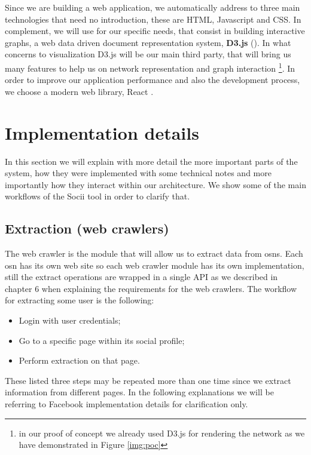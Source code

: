 Since we are building a web application, we automatically address to three main technologies that need no introduction, these are HTML, Javascript and CSS. In complement, we will use for our specific needs, that consist in building interactive graphs, a web data driven document representation system, \textbf{D3.js} (\cite{bostock2012d3}). In what concerns to visualization D3.js will be our main third party, that will bring us many features to help us on network representation and graph interaction \footnote{in our proof of concept we already used D3.js for rendering the network as we have demonstrated in Figure \ref{img:poc}}.
In order to improve our application performance and also the development process, we choose a modern web library, React \cite{react}.

\section{Implementation details}

In this section we will explain with more detail the more important parts of the system, how they were implemented with some technical notes and more importantly how they interact within our architecture. We show some of the main workflows of the Socii tool in order to clarify that.

\subsection{Extraction (web crawlers)}
The web crawler is the module that will allow us to extract data from \glspl{osn}. Each \gls{osn} has its own web site so each web crawler module has its own implementation, still the extract operations are wrapped in a single API as we described in chapter 6 when explaining the requirements for the web crawlers. The workflow for extracting some user is the following:
\begin{itemize}
    \item Login with user credentials;
    \item Go to a specific page within its social profile;
    \item Perform extraction on that page.
\end{itemize}
These listed three steps may be repeated more than one time since we extract information from different pages. In the following explanations we will be referring to Facebook implementation details for clarification only.

